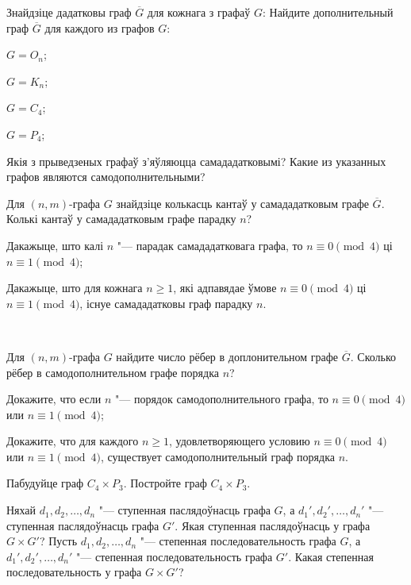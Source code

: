 \documentclass[12pt, a4paper]{article}
\begin{document}
\begin{problemList}
\smallskip

\problemItemWithCommonPartComplicated
{Знайдзіце дадатковы граф $\overline{G}$ для кожнага з графаў $G$:}
{Найдите дополнительный граф $\overline{G}$ для каждого из графов $G$:}
{%
\begin{belarusianEnumerateTwocol}
    \item $G=O_n$;
    \item $G=K_n$;
    \item $G=C_4$;
    \item $G=P_4$;
\end{belarusianEnumerateTwocol}
}
{Якія з прыведзеных графаў з'яўляюцца самададатковымі?}
{Какие из указанных графов являются самодополнительными?}

\bigskip

\problemItemSimple
{%
\begin{belarusianEnumerate}
    \item Для $(n,m)$-графа $G$ знайдзіце колькасць кантаў у самададатковым графе $\overline{G}$.
    Колькі кантаў у самададатковым графе парадку $n$?
    \item Дакажыце, што калі $n$ "--- парадак самададатковага графа,
    то $n\equiv 0\pmod 4$ ці $n \equiv 1 \pmod 4$;
    \item Дакажыце, што для кожнага $n\ge 1$, які адпавядае ўмове $n\equiv 0\pmod 4$
    ці $n \equiv 1 \pmod 4$, існуе самададатковы граф парадку $n$.
\end{belarusianEnumerate}\\[-30pt]
}
{%
\begin{russianEnumerate}
    \item Для $(n,m)$-графа $G$ найдите число рёбер в доплонительном графе $\overline{G}$.
    Сколько рёбер в самодополнительном графе порядка $n$?
    \item Докажите, что если $n$ "--- порядок самодополнительного графа, 
    то $n\equiv 0\pmod 4$ или $n \equiv 1 \pmod 4$;
    \item Докажите, что для каждого $n\ge 1$, удовлетворяющего условию $n\equiv 0\pmod 4$ 
    или $n \equiv 1 \pmod 4$, существует самодополнительный граф порядка $n$.
\end{russianEnumerate}
}

\bigskip

\problemItemSimple
{Пабудуйце граф $C_4\times P_3$.}
{Постройте граф $C_4\times P_3$.}

\bigskip

\problemItemSimple
{Няхай $d_1, d_2, \ldots, d_n$ "--- ступенная паслядоўнасць графа $G$,
а $d_1', d_2', \ldots, d_n'$ "--- ступенная паслядоўнасць графа $G'$.
Якая ступенная паслядоўнасць у графа $G\times G'$?}
{Пусть $d_1, d_2, \ldots, d_n$ "--- степенная последовательность графа $G$,
а $d_1', d_2', \ldots, d_n'$ "--- степенная последовательность графа $G'$.
Какая степенная последовательность у графа $G\times G'$?}


\end{problemList}
\end{document}

